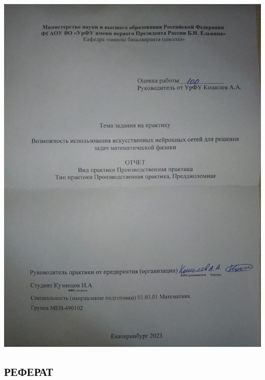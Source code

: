 \documentclass[a4paper,14pt]{extarticle} %
\author{Кузнецов Игорь}
\title{}
\date{\today}
\begin{document}
\def\figurename{Рисунок}
\newcommand{\brv}[1]{{\left| #1 \right|}}
\newcommand{\brr}[1]{{\left( #1 \right)}}
\newcommand{\brs}[1]{{\left[ #1 \right]}}
\newcommand{\brc}[1]{{\left\{ #1 \right\}}}
\newcommand{\brn}[1]{{\left\lVert #1 \right\rVert}}
\newcommand{\bra}[1]{{\left\langle #1 \right\rangle}}
\newcommand{\brrl}[1]{{\left( #1 \right]}}
\newcommand{\brrr}[1]{{\left[ #1 \right)}}
\newcommand{\under}[2]{{\underset{#2}{\underbrace{#1}}}}
\newcommand{\strm}[1]{\underset{#1}{\rightarrow}}
% 

\includegraphics[width=\textwidth]{титульник.jpg}
\thispagestyle{empty}

\newpage
\begin{center}
    \section*{РЕФЕРАТ}
\end{center}
\end{document}
